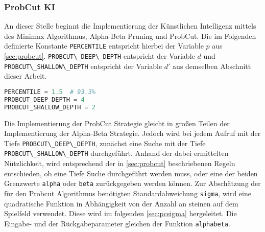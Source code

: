 \hypertarget{probcut-ki}{%
\subsubsection{ProbCut KI}\label{probcut-ki}}

An dieser Stelle beginnt die Implementierung der Künstlichen Intelligenz
mittels des Minimax Algorithmus, Alpha-Beta Pruning und ProbCut. Die im
Folgenden definierte Konstante \passthrough{\lstinline!PERCENTILE!}
entspricht hierbei der Variable \(p\) aus \autoref{sec:probcut}.
\passthrough{\lstinline!PROBCUT\_DEEP\_DEPTH!} entspricht der Variable
\(d\) und \passthrough{\lstinline!PROBCUT\_SHALLOW\_DEPTH!} entspricht
der Variable \(d'\) aus demselben Abschnitt dieser Arbeit.

\begin{lstlisting}[language=Python]
PERCENTILE = 1.5  # 93.3%
PROBCUT_DEEP_DEPTH = 4
PROBCUT_SHALLOW_DEPTH = 2
\end{lstlisting}

Die Implementierung der ProbCut Strategie gleicht in großen Teilen der
Implementierung der Alpha-Beta Strategie. Jedoch wird bei jedem Aufruf
mit der Tiefe \passthrough{\lstinline!PROBCUT\_DEEP\_DEPTH!}, zunächst
eine Suche mit der Tiefe
\passthrough{\lstinline!PROBCUT\_SHALLOW\_DEPTH!} durchgeführt. Anhand
der dabei ermittelten Nützlichkeit, wird entsprechend der in
\autoref{sec:probcut} beschriebenen Regeln entschieden, ob eine Tiefe
Suche durchgeführt werden muss, oder eine der beiden Grenzwerte
\passthrough{\lstinline!alpha!} oder \passthrough{\lstinline!beta!}
zurückgegeben werden können. Zur Abschätzung der für den Probcut
Algorithmus benötigten Standardabweichung
\passthrough{\lstinline!sigma!}, wird eine quadratische Funktion in
Abhängigkeit von der Anzahl an steinen auf dem Spielfeld verwendet.
Diese wird im folgenden \autoref{sec:pcsigma} hergeleitet. Die Eingabe-
und der Rückgabeparameter gleichen der Funktion
\passthrough{\lstinline!alphabeta!}.

